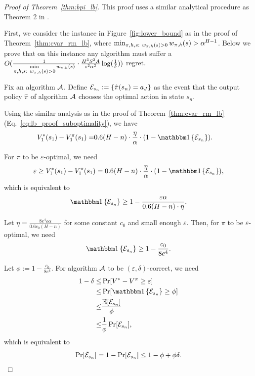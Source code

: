 \begin{proof}[Proof of Theorem~\ref{thm:bpi_lb}]
	This proof uses a similar analytical procedure as Theorem 2 in \citep{dann2015sample}.
	
	First, we consider the instance in Figure~\ref{fig:lower_bound} as in the proof of Theorem~\ref{thm:cvar_rm_lb}, where $\min_{\begin{subarray}{c}\pi,h,s:\  w_{\pi,h}(s)>0\end{subarray}} w_{\pi,h}(s) > \alpha^{H-1}$. Below we prove that on this instance any algorithm must suffer a $O( \frac{ 1 }{\min \limits_{\begin{subarray}{c}\pi,h,s:\  w_{\pi,h}(s)>0\end{subarray}} w_{\pi,h}(s)} \cdot \frac{H^3 S^2 A}{\varepsilon^2 \alpha^2} \log (\frac{1}{\delta}) )$ regret.
	
	Fix an algorithm $\mathcal{A}$. 
	Define $\mathcal{E}_{s_n}:=\{ \hat{\pi}(s_n)=a_J \}$ as the event that the output policy $\hat{\pi}$ of algorithm $\mathcal{A}$ chooses the optimal action in state $s_n$.
	
	Using the similar analysis as in the proof of Theorem~\ref{thm:cvar_rm_lb} (Eq.~\eqref{eq:lb_proof_suboptimality}), we have
	\begin{align*}
		V^{*}_1(s_1)-V^{\pi}_1(s_1) = & 0.6 (H-n) \cdot \frac{\eta}{\alpha} \cdot  (1-\indicator{ \cE_{s_n} }) .
	\end{align*}
	
	For $\pi$ to be $\varepsilon$-optimal, we need
	\begin{align*}
		\varepsilon \geq V^{*}_1(s_1)-V^{\pi}_1(s_1) =  0.6 (H-n) \cdot \frac{\eta}{\alpha} \cdot  (1-\indicator{ \cE_{s_n} })  ,
	\end{align*}
	which is equivalent to
	\begin{align*}
		\indicator{ \cE_{s_n} } \geq 1- \frac{\varepsilon \alpha}{0.6 (H-n) \cdot \eta} .
	\end{align*}
	
	Let $\eta=\frac{8 e^4 \varepsilon \alpha}{0.6c_0  (H-n)}$ for some constant $c_0$ and small enough $\varepsilon$. Then, for $\pi$ to be $\varepsilon$-optimal, we need
	\begin{align*}
		\indicator{ \cE_{s_n} } \geq 1-\frac{c_0}{8e^4} .
	\end{align*}
	
	Let $\phi:=1-\frac{c_0}{8e^4}$.
	For algorithm $\mathcal{A}$ to be $(\varepsilon,\delta)$-correct, we need
	\begin{align*}
		1-\delta \leq & \Pr[ V^{*}-V^{\pi} \geq \varepsilon]
		\\
		\leq & \Pr[\indicator{ \cE_{s_n} } \geq \phi]  
		\\
		\leq & \frac{\ex[\cE_{s_n}]}{\phi}
		\\
		\leq & \frac{1}{\phi} \Pr[\cE_{s_n}] ,
	\end{align*} 
	which is equivalent to
	\begin{align*}
		\Pr[\bar{\mathcal{E}}_{s_n}] = 1- \Pr[\mathcal{E}_{s_n}] \leq  1-\phi+\phi \delta .
	\end{align*}
	

\end{proof}
